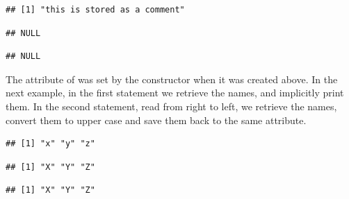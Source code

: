 \documentclass[krantz2]{krantz}\usepackage{knitr}
\begin{document}
\begin{knitrout}\footnotesize
{}\color{fgcolor}\begin{kframe}
\begin{alltt}
 \hlstd{)}
\end{alltt}
\begin{verbatim}
## [1] "this is stored as a comment"
\end{verbatim}
\begin{alltt}
 \hlstd{)} \hlkwb{<-} 
 \hlstd{)}
\end{alltt}
\begin{verbatim}
## NULL
\end{verbatim}
\begin{alltt}
 
\end{alltt}
\begin{verbatim}
## NULL
\end{verbatim}
\end{kframe}
\end{knitrout}

The  attribute of  was set by the  constructor when it was created above. In the next example, in the first statement we retrieve the names, and implicitly print them. In the second statement, read from right to left, we retrieve the names, convert them to upper case and save them back to the same attribute.

\begin{knitrout}\footnotesize
{}\color{fgcolor}\begin{kframe}
\begin{alltt}
\end{alltt}
\begin{verbatim}
## [1] "x" "y" "z"
\end{verbatim}
\begin{alltt}
 \hlkwb{<-} \hlstd{(}
\end{alltt}
\begin{verbatim}
## [1] "X" "Y" "Z"
\end{verbatim}
\begin{alltt}
 \hlstd{)} 
\end{alltt}
\begin{verbatim}
## [1] "X" "Y" "Z"
\end{verbatim}
\end{kframe}
\end{knitrout}
\end{document}
